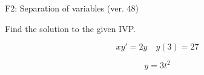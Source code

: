 \begin{exercise}
  \begin{exerciseTitle}F2: Separation of variables (ver. 48)\end{exerciseTitle}
  \begin{exerciseStatement}
    
Find the solution to the given IVP.

    
\[xy'= 2 y \hspace{1em} y( 3 ) = 27\]

  \end{exerciseStatement}
  \begin{exerciseAnswer}
    
\[y= 3 t^ 2\]

  \end{exerciseAnswer}
\end{exercise}